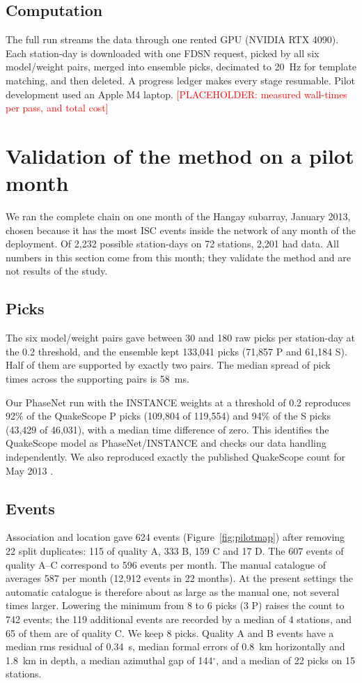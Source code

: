 \documentclass[11pt]{article}
\newcommand{\placeholder}[1]{\textcolor{red}{[PLACEHOLDER: #1]}}
\begin{document}
\subsection{Computation}
\label{sec:compute}
The full run streams the data through one rented GPU (NVIDIA RTX 4090). Each station-day is downloaded with one FDSN request, picked by all six model/weight pairs, merged into ensemble picks, decimated to 20~Hz for template matching, and then deleted. A progress ledger makes every stage resumable. Pilot development used an Apple M4 laptop. \placeholder{measured wall-times per pass, and total cost}

\section{Validation of the method on a pilot month}
\label{sec:validation}
We ran the complete chain on one month of the Hangay subarray, January 2013, chosen because it has the most ISC events inside the network of any month of the deployment. Of 2,232 possible station-days on 72 stations, 2,201 had data. All numbers in this section come from this month; they validate the method and are not results of the study.

\subsection{Picks}
The six model/weight pairs gave between 30 and 180 raw picks per station-day at the 0.2 threshold, and the ensemble kept 133,041 picks (71,857 P and 61,184 S). Half of them are supported by exactly two pairs. The median spread of pick times across the supporting pairs is 58~ms.

Our PhaseNet run with the INSTANCE weights at a threshold of 0.2 reproduces 92\% of the QuakeScope P picks (109,804 of 119,554) and 94\% of the S picks (43,429 of 46,031), with a median time difference of zero. This identifies the QuakeScope model as PhaseNet/INSTANCE and checks our data handling independently. We also reproduced exactly the published QuakeScope count for May 2013 \citep[209,901 picks on 72 stations;][]{ni2025}.

\subsection{Events}
Association and location gave 624 events (Figure~\ref{fig:pilotmap}) after removing 22 split duplicates: 115 of quality A, 333 B, 159 C and 17 D. The 607 events of quality A--C correspond to 596 events per month. The manual catalogue of \citet{dashdondog2020} averages 587 per month (12,912 events in 22 months). At the present settings the automatic catalogue is therefore about as large as the manual one, not several times larger. Lowering the minimum from 8 to 6 picks (3 P) raises the count to 742 events; the 119 additional events are recorded by a median of 4 stations, and 65 of them are of quality C. We keep 8 picks. Quality A and B events have a median rms residual of 0.34~s, median formal errors of 0.8~km horizontally and 1.8~km in depth, a median azimuthal gap of 144$^\circ$, and a median of 22 picks on 15 stations.
\end{document}
